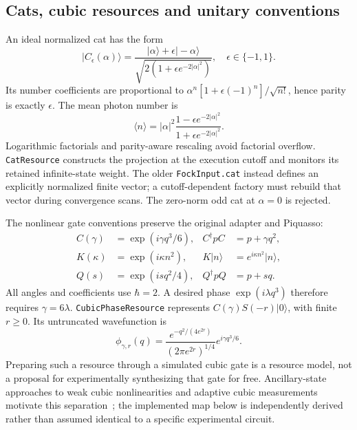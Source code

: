 \subsection{Cats, cubic resources and unitary conventions}

An ideal normalized cat has the form
\begin{equation}
 |C_\epsilon(\alpha)\rangle=
 \frac{|\alpha\rangle+\epsilon|-\alpha\rangle}
 {\sqrt{2(1+\epsilon e^{-2|\alpha|^2})}},\quad \epsilon\in\{-1,1\}.
\end{equation}
Its number coefficients are proportional to
$\alpha^n[1+\epsilon(-1)^n]/\sqrt{n!}$, hence parity is exactly $\epsilon$.
The mean photon number is
\begin{equation}
 \langle n\rangle=|\alpha|^2
 \frac{1-\epsilon e^{-2|\alpha|^2}}
 {1+\epsilon e^{-2|\alpha|^2}}.
\end{equation}
Logarithmic factorials and parity-aware rescaling avoid factorial overflow.
\texttt{CatResource} constructs the projection at the execution cutoff and
monitors its retained infinite-state weight. The older
\texttt{FockInput.cat} instead defines an explicitly normalized finite vector;
a cutoff-dependent factory must rebuild that vector during convergence scans.
The zero-norm odd cat at $\alpha=0$ is rejected.

The nonlinear gate conventions preserve the original adapter and Piquasso:
\begin{align}
 C(\gamma)&=\exp(i\gamma q^3/6), & C^\dagger pC&=p+\gamma q^2,\label{eq:cubicConvention}\\
 K(\kappa)&=\exp(i\kappa n^2), & K|n\rangle&=e^{i\kappa n^2}|n\rangle,\\
 Q(s)&=\exp(isq^2/4), & Q^\dagger pQ&=p+sq.
\end{align}
All angles and coefficients use $\hbar=2$. A desired phase $\exp(i\lambda q^3)$
therefore requires $\gamma=6\lambda$. \texttt{CubicPhaseResource} represents
$C(\gamma)S(-r)|0\rangle$, with finite $r\geq0$. Its untruncated wavefunction is
\begin{equation}
 \phi_{\gamma,r}(q)=\frac{e^{-q^2/(4e^{2r})}}{(2\pi e^{2r})^{1/4}}
 e^{i\gamma q^3/6}.
\end{equation}
Preparing such a resource through a simulated cubic gate is a resource model,
not a proposal for experimentally synthesizing that gate for free.
Ancillary-state approaches to weak cubic nonlinearities and adaptive cubic
measurements motivate this separation~\cite{marek2011,miyata2016}; the implemented
map below is independently derived rather than assumed identical to a specific
experimental circuit.

